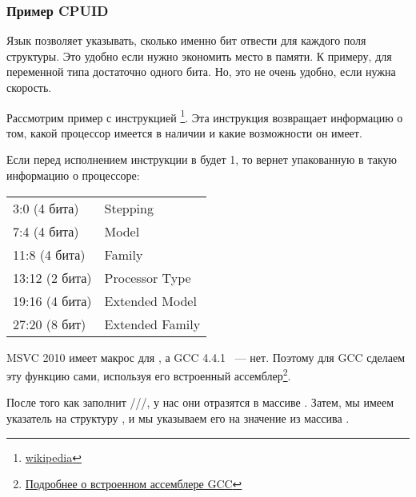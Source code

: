 \subsubsection{Пример CPUID}

Язык \CCpp позволяет указывать, сколько именно бит отвести для каждого поля структуры. 
Это удобно если нужно экономить место в памяти. К примеру, для переменной типа \Tbool достаточно одного бита.
Но, это не очень удобно, если нужна скорость.


\newcommand{\FNCPUID}{\footnote{\href{http://en.wikipedia.org/wiki/CPUID}{wikipedia}}}

\label{cpuid}
Рассмотрим пример с инструкцией \CPUID\FNCPUID. 
Эта инструкция возвращает информацию о том, какой процессор имеется в наличии и какие возможности он имеет.

Если перед исполнением инструкции в \EAX будет 1, 
то \CPUID вернет упакованную в \EAX такую информацию о процессоре:

\begin{center}
\begin{tabular}{ | l | l | }
\hline
3:0 (4 бита)& Stepping \\
7:4 (4 бита) & Model \\
11:8 (4 бита) & Family \\
13:12 (2 бита) & Processor Type \\
19:16 (4 бита) & Extended Model \\
27:20 (8 бит) & Extended Family \\
\hline
\end{tabular}
\end{center}

\newcommand{\FNGCCAS}{\footnote{\href{http://www.ibiblio.org/gferg/ldp/GCC-Inline-Assembly-HOWTO.html}
{Подробнее о встроенном ассемблере GCC}}}

MSVC 2010 имеет макрос для \CPUID, а GCC 4.4.1 ~--- нет. 
Поэтому для GCC сделаем эту функцию сами, используя его встроенный ассемблер\FNGCCAS.



После того как \CPUID заполнит \EAX/\EBX/\ECX/\EDX, у нас они отразятся в массиве . 
Затем, мы имеем указатель на структуру , и мы указываем его на значение 
\EAX из массива .

